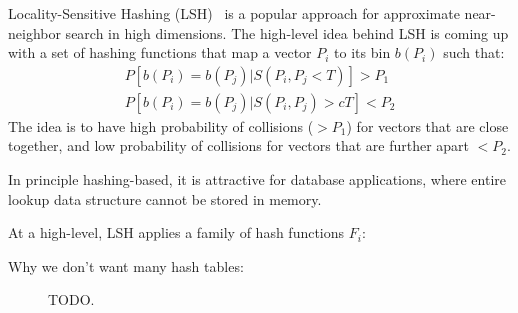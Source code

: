 Locality-Sensitive Hashing (LSH)~\cite{LSH:Andoni}
is a popular approach for approximate near-neighbor search
in high dimensions. The high-level idea behind LSH is
coming up with a set of hashing functions that map
a vector $P_i$ to its bin $b(P_i)$ such that:
\begin{equation*}
\begin{aligned}
P[b(P_i) = b(P_j) | S(P_i, P_j < T)] > P_1\\
P[b(P_i) = b(P_j) | S(P_i, P_j) > cT] < P_2
\end{aligned}
\end{equation*}
The idea is to have high probability of collisions ($> P_1$) for
vectors that are close together, and low probability of collisions
for vectors that are further apart $< P_2$.

In principle hashing-based, it is
attractive for database applications, where entire lookup data structure
cannot be stored in memory.

At a high-level, LSH applies a family of hash functions $F_i$:

Why we don't want many hash tables:






\begin{figure}[ht!]
\qquad
{}
\caption{TODO.}

\end{figure}

